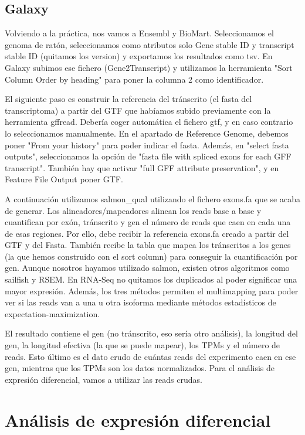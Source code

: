 \subsection{Galaxy}
Volviendo a la práctica, nos vamos a Ensembl y BioMart. Seleccionamos el genoma de ratón, seleccionamos como atributos solo Gene stable ID y transcript stable ID (quitamos los version) y exportamos los resultados como tsv. En Galaxy subimos ese fichero (Gene2Transcript) y utilizamos la herramienta "Sort Column Order by heading" para poner la columna 2 como identificador. 

El siguiente paso es construir la referencia del tránscrito (el fasta del transcriptoma) a partir del GTF que habíamos subido previamente con la herramienta gffread. Debería coger automática el fichero gtf, y en caso contrario lo seleccionamos manualmente. En el apartado de Reference Genome, debemos poner "From your history" para poder indicar el fasta. Además, en "select fasta outputs", seleccionamos la opción de "fasta file with spliced exons for each GFF transcript". También hay que activar "full GFF attribute preservation", y en Feature File Output poner GTF.

A continuación utilizamos salmon\_qual utilizando el fichero exons.fa que se acaba de generar.
Los alineadores/mapeadores alinean los reads base a base y cuantifican por exón, tránscrito y gen el número de reads que caen en cada una de esas regiones. Por ello, debe recibir la referencia exons.fa creado a partir del GTF y del Fasta. También recibe la tabla que mapea los tránscritos a los genes (la que hemos construido con el sort column) para conseguir la cuantificación por gen. Aunque nosotros hayamos utilizado salmon, existen otros algoritmos como sailfish y RSEM. En RNA-Seq no quitamos los duplicados al poder significar una mayor expresión. Además, los tres métodos permiten el multimapping para poder ver si las reads van a una u otra isoforma mediante métodos estadísticos de expectation-maximization. 

El resultado contiene el gen (no tránscrito, eso sería otro análisis), la longitud del gen, la longitud efectiva (la que se puede mapear), los TPMs y el número de reads. Esto último es el dato crudo de cuántas reads del experimento caen en ese gen, mientras que los TPMs son los datos normalizados. Para el análisis de expresión diferencial, vamos a utilizar las reads crudas. 

\section{Análisis de expresión diferencial}
